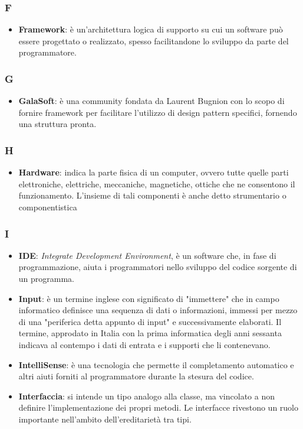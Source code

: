 \subsubsection{F}
\begin{itemize}
	\item \textbf{Framework}: è un'architettura logica di supporto su cui un software può essere progettato o realizzato, spesso facilitandone lo sviluppo da parte del programmatore.
\end{itemize}

\subsubsection{G}
\begin{itemize}
	\item \textbf{GalaSoft}: è una community fondata da Laurent Bugnion con lo scopo di fornire framework per facilitare l'utilizzo di design pattern specifici, fornendo una struttura pronta.
\end{itemize}

\subsubsection{H}
\begin{itemize}
	\item \textbf{Hardware}: indica la parte fisica di un computer, ovvero tutte quelle parti elettroniche, elettriche, meccaniche, magnetiche, ottiche che ne consentono il funzionamento. L'insieme di tali componenti è anche detto strumentario o componentistica
\end{itemize}

\subsubsection{I}
\begin{itemize}
	\item \textbf{IDE}: \textit{Integrate Development Environment}, è un software che, in fase di programmazione, aiuta i programmatori nello sviluppo del codice sorgente di un programma.
	\item \textbf{Input}:  è un termine inglese con significato di "immettere" che in campo informatico definisce una sequenza di dati o informazioni, immessi per mezzo di una "periferica detta appunto di input" e successivamente elaborati. Il termine, approdato in Italia con la prima informatica degli anni sessanta indicava al contempo i dati di entrata e i supporti che li contenevano.
	\item \textbf{IntelliSense}: è una tecnologia che permette il completamento automatico e altri aiuti forniti al programmatore durante la stesura del codice.
	\item \textbf{Interfaccia}:  si intende un tipo analogo alla classe, ma vincolato a non definire l'implementazione dei propri metodi. Le interfacce rivestono un ruolo importante nell'ambito dell'ereditarietà tra tipi.
\end{itemize}

